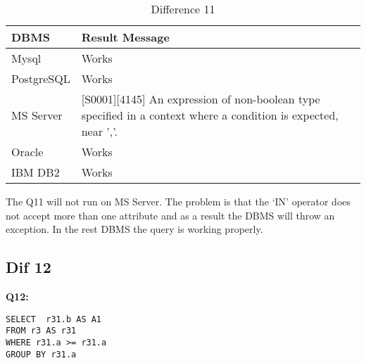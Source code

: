 \begin{table}[h]
\centering
\caption{Difference 11}
\label{my-label}
\begin{tabular}{|p{2cm}|p{11.5cm}|}
\hline
\textbf{DBMS} & \textbf{Result Message}                                                                                                 \\ \hline
Mysql         & Works                                                                                                                   \\ \hline
PostgreSQL    & Works                                                                                                                   \\ \hline
MS Server     & {[}S0001{]}{[}4145{]} An expression of non-boolean type specified in a context where a condition is expected, near ','. \\ \hline
Oracle        & Works                                                                                                                   \\ \hline
IBM DB2       & Works                                                                                                                   \\ \hline
\end{tabular}
\end{table}


The Q11 will not run on MS Server. The problem is that the ‘IN’ operator does not accept more than one attribute and as a result the DBMS will throw an exception. In the rest DBMS the query is working properly. 

\subsection{Dif 12}
 
\textbf{Q12:}
\begin{mdframed}[backgroundcolor=lightgray!20]
\begin{lstlisting}[style=SQL]
SELECT  r31.b AS A1
FROM r3 AS r31
WHERE r31.a >= r31.a
GROUP BY r31.a
\end{lstlisting}
\end{mdframed}
 
